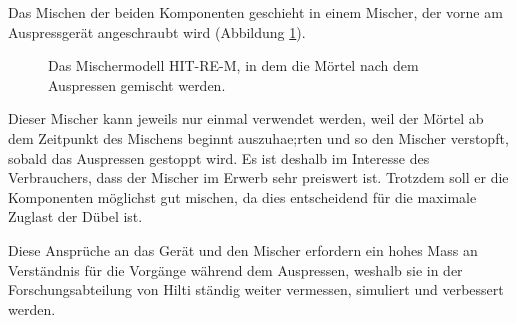 Das Mischen der beiden Komponenten geschieht in einem Mischer, der vorne am Auspressgerät angeschraubt wird (Abbildung \ref{fig:Mischer}).
%
\begin{figure}
    \centering
    \caption{Das Mischermodell HIT-RE-M, in dem die Mörtel nach dem Auspressen gemischt werden.}
    \label{fig:Mischer}
\end{figure}
%
Dieser Mischer kann jeweils nur einmal verwendet werden, weil der Mörtel ab dem Zeitpunkt des Mischens beginnt auszuhae;rten und so den Mischer verstopft, sobald das Auspressen gestoppt wird. Es ist deshalb im Interesse des Verbrauchers, dass der Mischer im Erwerb sehr preiswert ist. Trotzdem soll er die Komponenten möglichst gut mischen, da dies entscheidend für die maximale Zuglast der Dübel ist.

Diese Ansprüche an das Gerät und den Mischer erfordern ein hohes Mass an Verständnis für die Vorgänge während dem Auspressen, weshalb sie in der Forschungsabteilung von Hilti ständig weiter vermessen, simuliert und verbessert werden.
%
